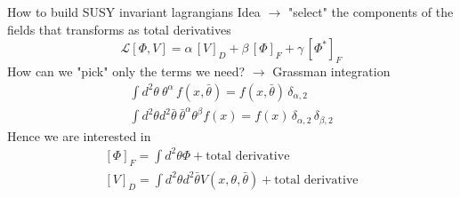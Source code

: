 \documentclass[10pt]{beamer}
\begin{document}
\begin{frame}{How to build SUSY invariant lagrangians}
Idea $\rightarrow$ "select" the components of the fields that transforms as total derivatives
\begin{equation*} 
    \mathcal{L}[\Phi, V] = \alpha \, \left[V\right]_D + \beta \, \left[\Phi\right]_F  + \gamma \, \left[\Phi^*\right]_F
\end{equation*}
How can we "pick" only the terms we need? $\rightarrow$ Grassman integration
\begin{gather*}
    \int d^2\theta \ \theta^\alpha \, f(x, \bar\theta) = f(x, \bar\theta) \, \delta_{\alpha, 2} \\
    \int d^2\theta d^2\bar\theta  \ \bar\theta^\alpha \theta^\beta f(x) = f(x) \, \delta_{\alpha, 2} \, \delta_{\beta, 2}
\end{gather*}
Hence we are interested in
\begin{gather*}
    \left[\Phi\right]_F = \int d^2\theta \Phi + \text{total derivative} \\
    \left[V\right]_D = \int d^2\theta d^2\bar\theta V(x, \theta, \bar\theta) + \text{total derivative}
\end{gather*}
\end{frame}
\end{document}
